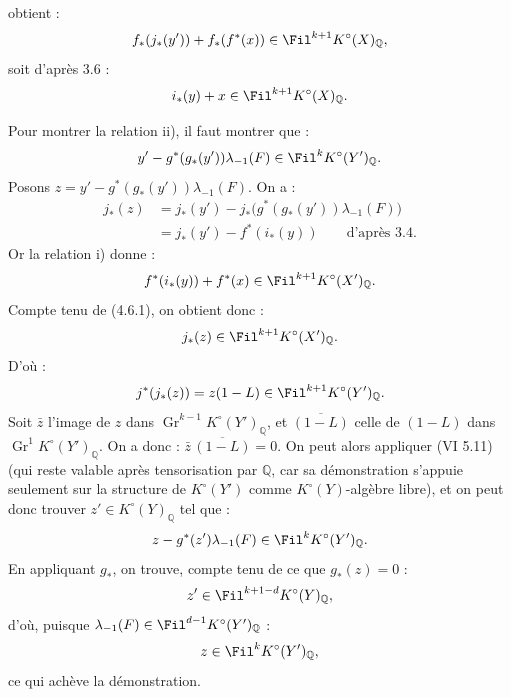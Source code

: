 obtient :
\[
  f_*(j_*(y'))+f_*(f^*(x))\in\Fil^{k+1}K^\circ(X)_{\mathbb Q},
\]
soit d'après 3.6 :
\[
  i_*(y)+x\in\Fil^{k+1}K^\circ(X)_{\mathbb Q}.
\]

Pour montrer la relation ii), il faut montrer que :
\[
  y'-g^*(g_*(y'))\lambda_{-1}(F)\in\Fil^kK^\circ(Y')_{\mathbb Q}.
\]
Posons \(z=y'-g^*(g_*(y'))\lambda_{-1}(F)\). On a :
\[
\begin{aligned}
j_*(z)
  &=j_*(y')-j_*\bigl(g^*(g_*(y'))\lambda_{-1}(F)\bigr)\\
  &=j_*(y')-f^*(i_*(y))\qquad\text{d'après 3.4.}
\end{aligned}
\]
Or la relation i) donne :
\[
  f^*(i_*(y))+f^*(x)\in\Fil^{k+1}K^\circ(X')_{\mathbb Q}.
\]
Compte tenu de (4.6.1), on obtient donc :
\[
  j_*(z)\in\Fil^{k+1}K^\circ(X')_{\mathbb Q}.
\]
D'où :
\[
  j^*(j_*(z))=z(1-L)\in\Fil^{k+1}K^\circ(Y')_{\mathbb Q}.
\]
Soit \(\bar z\) l'image de \(z\) dans \(\operatorname{Gr}^{k-1}K^\circ(Y')_{\mathbb Q}\), et \(\overline{(1-L)}\) celle de \((1-L)\) dans \(\operatorname{Gr}^{1}K^\circ(Y')_{\mathbb Q}\). On a donc : \(\bar z\,\overline{(1-L)}=0\). On peut alors appliquer (VI 5.11) (qui reste valable après tensorisation par \(\mathbb Q\), car sa démonstration s'appuie seulement sur la structure de \(K^\circ(Y')\) comme \(K^\circ(Y)\)-algèbre libre), et on peut donc trouver \(z'\in K^\circ(Y)_{\mathbb Q}\) tel que :
\[
  z-g^*(z')\lambda_{-1}(F)\in\Fil^kK^\circ(Y')_{\mathbb Q}.
\]
En appliquant \(g_*\), on trouve, compte tenu de ce que \(g_*(z)=0\) :
\[
  z'\in\Fil^{k+1-d}K^\circ(Y)_{\mathbb Q},
\]
d'où, puisque \(\lambda_{-1}(F)\in\Fil^{d-1}K^\circ(Y')_{\mathbb Q}\) :
\[
  z\in\Fil^kK^\circ(Y')_{\mathbb Q},
\]
ce qui achève la démonstration.


